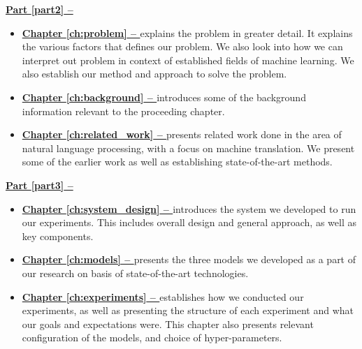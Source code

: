 \vspace{0.5cm}\noindent
\begin{minipage}{\linewidth}
    \textbf{{\hyperref[part2]{Part \ref{part2} -- }}}
    \begin{itemize}
        \item\textbf{\hyperref[ch:problem]{Chapter \ref{ch:problem} -- }} explains the problem in greater detail. It explains the various factors that defines our problem. We also look into how we can interpret out problem in context of established fields of machine learning. We also establish our method and approach to solve the problem.
        \item\textbf{\hyperref[ch:background]{Chapter \ref{ch:background} -- }} introduces some of the background information relevant to the proceeding chapter.
        \item\textbf{\hyperref[ch:related_work]{Chapter \ref{ch:related_work} -- }} presents related work done in the area of natural language processing, with a focus on machine translation. We present some of the earlier work as well as establishing state-of-the-art methods.
    \end{itemize}
\end{minipage}

\vspace{0.5cm}\noindent
\begin{minipage}{\linewidth}
    \textbf{{\hyperref[part3]{Part \ref{part3} -- }}}
    \begin{itemize}
        \item\textbf{\hyperref[ch:system_design]{Chapter \ref{ch:system_design} -- }} introduces the system we developed to run our experiments. This includes overall design and general approach, as well as key components.
        \item\textbf{\hyperref[ch:models]{Chapter \ref{ch:models} -- }} presents the three models we developed as a part of our research on basis of state-of-the-art technologies.
        \item\textbf{\hyperref[ch:experiments]{Chapter \ref{ch:experiments} -- }} establishes how we conducted our experiments, as well as presenting the structure of each experiment and what our goals and expectations were. This chapter also presents relevant configuration of the models, and choice of hyper-parameters.
    \end{itemize}
\end{minipage}

